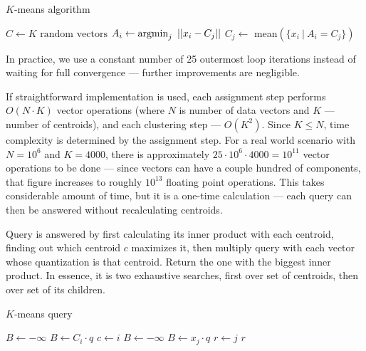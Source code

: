 \begin{algorithm}[H]
	\caption{$K$-means algorithm}
	\begin{algorithmic}
		\State $C \gets K \text{ random vectors}$
		\Repeat
				\State $A_i \gets \operatorname*{argmin}_{j}\ || x_i - C_j || $
			\EndFor
				\State $C_j \gets$ mean$(\{x_i\ |\ A_i = C_j\}) $
			\EndFor

		\State {}
	\end{algorithmic}
\end{algorithm}

In practice, we use a constant number of 25 outermost loop iterations
instead of waiting for full convergence --- further improvements are negligible.

If straightforward implementation is used, each assignment step performs
$O(N \cdot K)$ vector operations (where $N$ is number of data vectors and
$K$ --- number of centroids), and each clustering step --- $O(K^2)$. Since
$K \le N$, time complexity is determined by the assignment step. For a real
world scenario with $N = 10^6$ and $K = 4000$, there is approximately
$25 \cdot 10^6 \cdot 4000 = 10^{11}$ vector operations to be done --- since vectors
can have a couple hundred of components, that figure increases to roughly
$10^{13}$ floating point operations. This takes considerable amount of time,
but it is a one-time calculation --- each query can then be answered without
recalculating centroids.

Query is answered by first calculating its inner product with each centroid,
finding out which centroid $c$ maximizes it, then multiply query with each vector
whose quantization is that centroid. Return the one
with the biggest inner product. In essence, it is two exhaustive searches,
first over set of centroids, then over set of its children.

\begin{algorithm}[H]
	\caption{$K$-means query}
	\begin{algorithmic}
		\State $B \gets -\infty$
		\For{$ i < K $}
			\If{$C_i \cdot q > B$}
				\State $B \gets C_i \cdot q$
				\State $c \gets i$
			\EndIf
		\EndFor
		\State $B \gets -\infty$
		\For{$ j \in \{ j\ |\ A_j = c \} $}
			\If {$x_j \cdot q > B$}
				\State $B \gets x_j \cdot q$
				\State $r \gets j$
			\EndIf
		\EndFor
		\State \Return $r$
	\end{algorithmic}
\end{algorithm}

